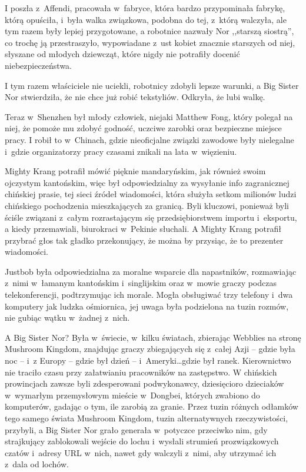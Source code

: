 \documentclass[oneside,polish,11pt,rmheadings]{mwbk}
\begin{document}
I poszła z~Affendi, pracowała w~fabryce, która bardzo przypominała fabrykę, którą opuściła, i~była walka związkowa, podobna do tej, z~którą walczyła, ale tym razem były lepiej przygotowane, a robotnice nazwały Nor ,,starszą siostrą'', co trochę ją przestraszyło, wypowiadane z~ust kobiet znacznie starszych od niej, słyszane od młodych dziewcząt, które nigdy nie potrafiły docenić niebezpieczeństwa. 


I tym razem właściciele nie uciekli, robotnicy zdobyli lepsze warunki, a Big Sister Nor stwierdziła, że nie chce już robić tekstyliów. Odkryła, że lubi walkę. 


Teraz w~Shenzhen był młody człowiek, niejaki Matthew Fong, który polegał na niej, że pomoże mu zdobyć godność, uczciwe zarobki oraz bezpieczne miejsce pracy. I robił to w~Chinach, gdzie nieoficjalne związki zawodowe były nielegalne i~gdzie organizatorzy pracy czasami znikali na lata w~więzieniu. 


Mighty Krang potrafił mówić pięknie mandaryńskim, jak również swoim ojczystym kantońskim, więc był odpowiedzialny za wysyłanie info zagranicznej chińskiej prasie, tej sieci źródeł wiadomości, która służyła setkom milionów ludzi chińskiego pochodzenia mieszkających za granicą. Byli kluczowi, ponieważ byli ściśle związani z~całym rozrastającym się przedsiębiorstwem importu i~eksportu, a kiedy przemawiali, biurokraci w~Pekinie słuchali. A Mighty Krang potrafił przybrać głos tak gładko przekonujący, że można by przysiąc, że to prezenter wiadomości. 


Justbob była odpowiedzialna za moralne wsparcie dla napastników, rozmawiając z~nimi w~łamanym kantońskim i~singlijskim oraz w~mowie graczy podczas telekonferencji, podtrzymując ich morale. Mogła obsługiwać trzy telefony i~dwa komputery jak ludzka ośmiornica, jej uwaga była podzielona na tuzin rozmów, nie gubiąc wątku w~żadnej z~nich. 


A Big Sister Nor? Była w~świecie, w~kilku światach, zbierając Webblies na stronę Mushroom Kingdom, znajdując graczy zbiegających się z~całej Azji -- gdzie była noc -- i~z Europy -- gdzie był dzień -- i~Ameryki\ldots  gdzie był ranek. Kierownictwo nie traciło czasu przy załatwianiu pracowników na zastępstwo. W chińskich prowincjach zawsze byli zdesperowani podwykonawcy, dziesięcioro dzieciaków w~wymarłym przemysłowym mieście w~Dongbei, których zwabiono do komputerów, gadając o tym, ile zarobią za granie. Przez tuzin różnych odłamków tego samego świata Mushroom Kingdom, tuzin alternatywnych rzeczywistości, przybyli, a Big Sister Nor grało generała w~potyczce przeciwko nim, gdy strajkujący zablokowali wejście do lochu i~wysłali strumień prozwiązkowych czatów i~adresy URL w~nich, nawet gdy walczyli z~nimi, aby utrzymać ich z~dala od lochów. 
\end{document}

